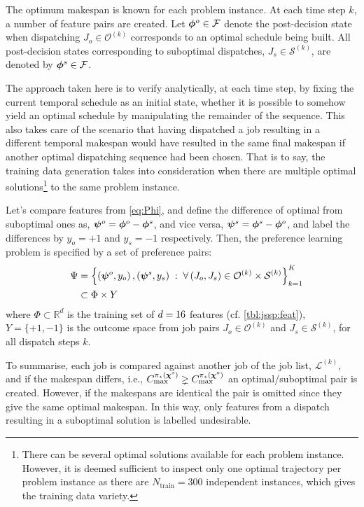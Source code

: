 \documentclass[twocolumn]{svjour3}
\begin{document}
The optimum makespan is known for each problem instance. At each time step $k$, 
a number of feature pairs are created. 
Let $\bm{\phi}^{o}\in\mathcal{F}$ denote the post-decision state when dispatching 
$J_o\in\mathcal{O}^{(k)}$ corresponds to an optimal schedule being built. 
All post-decision states corresponding to suboptimal dispatches, 
$J_s\in\mathcal{S}^{(k)}$, are denoted by $\bm{\phi}^{s}\in\mathcal{F}$.

The approach taken here is to verify analytically, at each time step, by fixing 
the current temporal schedule as an initial state, whether it is possible to 
somehow yield an optimal schedule by manipulating the remainder of the 
sequence. This also takes care of the scenario that having dispatched a job 
resulting in a different temporal makespan would have resulted in the same 
final makespan if another optimal dispatching sequence had been chosen. 
That is to say, the training data generation takes into consideration when 
there are multiple optimal solutions\footnote{
There can be several optimal solutions available for each problem instance. 
However, it is deemed sufficient to inspect only one optimal trajectory per 
problem instance as there are $N_{\text{train}}=300$ independent instances, 
which gives the training data variety.} 
to the same problem instance. 

Let's compare features from \cref{eq:Phi}, and define the difference of optimal 
from suboptimal ones as, 
\mbox{$\bm \psi^{o}=\bm{\phi}^{o}-\bm{\phi}^{s}$}, and vice versa, 
\mbox{$\bm \psi^{s}=\bm{\phi}^{s}-\bm{\phi}^{o}$}, and label the differences by $y_o=+1$ 
and $y_s=-1$ respectively. 
Then, the preference learning problem is specified by a set of preference pairs:
\begin{equation}
\begin{split}
\quad \Psi & = \left\{\left(\bm \psi^o,y_o\right),\left(\bm \psi^s,y_s\right)
\;:\; 
\forall \left(J_o,J_s\right) \in \mathcal{O}^{(k)} \times 
\mathcal{S}^{(k)}\right\}_{k=1}^{K} \\
& \subset  \Phi\times Y
\end{split} \label{eq:prefset}
\end{equation}
where $\Phi\subset \mathbb{R}^d$ is the training set of $d=16$ 
features (cf. \cref{tbl:jssp:feat}), $Y=\{+1,-1\}$ is the outcome space from 
job pairs $J_o\in\mathcal{O}^{(k)}$ and $J_s\in\mathcal{S}^{(k)}$, for all 
dispatch steps $k$.

To summarise, each job is compared against another job of the job list, 
$\mathcal{L}^{(k)}$, and if the makespan differs, i.e., 
$C_{\max}^{\pi_\star(\bm \chi^s)} \gneq C_{\max}^{\pi_\star(\bm \chi^o)}$ an 
optimal/suboptimal pair is created. 
However, if the makespans are identical the pair is omitted since they give the 
same optimal makespan. 
In this way, only features from a dispatch resulting in a suboptimal solution 
is labelled undesirable.
\end{document}
